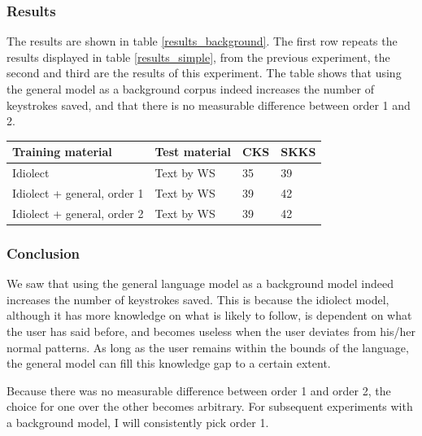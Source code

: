 \documentclass[12pt]{article}
\let\originaltable\table
\let\endoriginaltable\endtable
\renewenvironment{table}[1][ht]{%
  \originaltable[#1]
  \centering}%
  {\endoriginaltable}
\begin{document}
\subsubsection{Results}

The results are shown in table \ref{results_background}. The first row repeats the results displayed in table \ref{results_simple}, from the previous experiment, the second and third are the results of this experiment. The table shows that using the general model as a background corpus indeed increases the number of keystrokes saved, and that there is no measurable difference between order 1 and 2.

\begin{table}[H]
\begin{tabular}{ll|ll} 
Training material&Test material&CKS&SKKS\\
\hline
Idiolect&Text by WS&35&39\\
Idiolect + general, order 1&Text by WS&39&42\\
Idiolect + general, order 2&Text by WS&39&42\\
\end{tabular} 
\caption{Percentage of keystrokes that can be saved when using the general model as background model} \label{results_background}
\end{table}

\subsubsection{Conclusion}
We saw that using the general language model as a background model indeed increases the number of keystrokes saved. This is because the idiolect model, although it has more knowledge on what is likely to follow, is dependent on what the user has said before, and becomes useless when the user deviates from his/her normal patterns. As long as the user remains within the bounds of the language, the general model can fill this knowledge gap to a certain extent.

Because there was no measurable difference between order 1 and order 2, the choice for one over the other becomes arbitrary. For subsequent experiments with a background model, I will consistently pick order 1.
\end{document}
